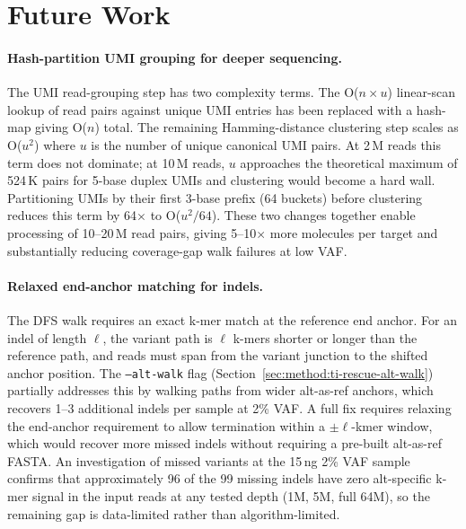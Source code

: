 \section{Future Work}
\label{sec:future}

\paragraph{Hash-partition UMI grouping for deeper sequencing.}
The UMI read-grouping step has two complexity terms.
The O($n \times u$) linear-scan lookup of read pairs against unique UMI entries has
been replaced with a hash-map giving O($n$) total.
The remaining Hamming-distance clustering step scales as O($u^2$) where $u$ is
the number of unique canonical UMI pairs.
At 2\,M reads this term does not dominate; at 10\,M reads, $u$ approaches the
theoretical maximum of 524\,K pairs for 5-base duplex UMIs and clustering would
become a hard wall.
Partitioning UMIs by their first 3-base prefix (64 buckets) before clustering
reduces this term by 64$\times$ to O($u^2/64$).
These two changes together enable processing of 10--20\,M read pairs, giving
5--10$\times$ more molecules per target and substantially reducing coverage-gap
walk failures at low VAF.

\paragraph{Relaxed end-anchor matching for indels.}
The DFS walk requires an exact k-mer match at the reference end anchor. For an
indel of length $\ell$, the variant path is $\ell$ k-mers shorter or longer than
the reference path, and reads must span from the variant junction to the shifted
anchor position. The \texttt{--alt-walk} flag (Section~\ref{sec:method:ti-rescue-alt-walk})
partially addresses this by walking paths from wider alt-as-ref anchors, which
recovers 1--3 additional indels per sample at 2\% VAF. A full fix requires
relaxing the end-anchor requirement to allow termination within a
$\pm \ell$-kmer window, which would recover more missed indels without
requiring a pre-built alt-as-ref FASTA. An investigation of missed variants at
the 15\,ng 2\% VAF sample confirms that approximately 96 of the 99 missing
indels have zero alt-specific k-mer signal in the input reads at any tested
depth (1M, 5M, full 64M), so the remaining gap is data-limited rather than
algorithm-limited.

